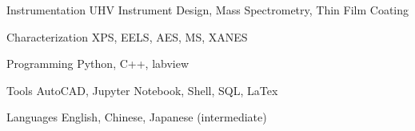 


\begin{cvskills}

  
\cvskill
{Instrumentation}
{UHV Instrument Design, Mass Spectrometry, Thin Film Coating}


\cvskill
{Characterization}
{XPS, EELS, AES, MS, XANES}


\cvskill
{Programming}
{Python, C++, labview}


\cvskill
{Tools}
{AutoCAD, Jupyter Notebook, Shell, SQL, LaTex}


\cvskill
{Languages}
{English, Chinese, Japanese (intermediate)}


\end{cvskills}